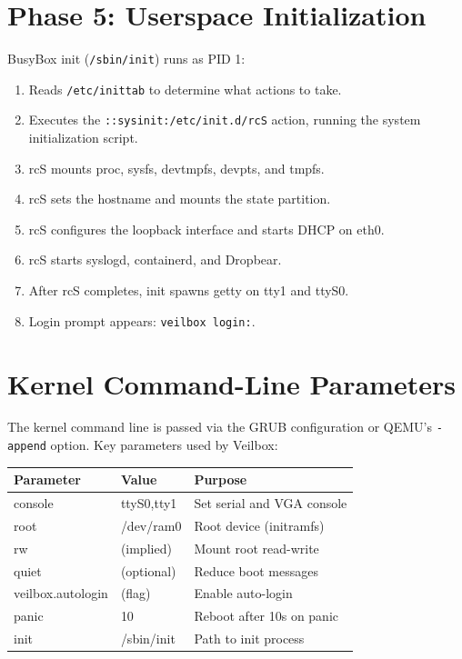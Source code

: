 \section{Phase 5: Userspace Initialization}

BusyBox init (\texttt{/sbin/init}) runs as PID 1:

\begin{enumerate}[nosep]
  \item Reads \texttt{/etc/inittab} to determine what actions to take.
  \item Executes the \texttt{::sysinit:/etc/init.d/rcS} action, running
        the system initialization script.
  \item rcS mounts proc, sysfs, devtmpfs, devpts, and tmpfs.
  \item rcS sets the hostname and mounts the state partition.
  \item rcS configures the loopback interface and starts DHCP on eth0.
  \item rcS starts syslogd, containerd, and Dropbear.
  \item After rcS completes, init spawns getty on tty1 and ttyS0.
  \item Login prompt appears: \texttt{veilbox login:}.
\end{enumerate}


\section{Kernel Command-Line Parameters}

The kernel command line is passed via the GRUB configuration or QEMU's
\texttt{-append} option. Key parameters used by Veilbox:

\begin{longtable}{|p{4cm}|p{3cm}|p{5cm}|}
\hline
\textbf{Parameter} & \textbf{Value} & \textbf{Purpose} \\
\hline
console & ttyS0,tty1 & Set serial and VGA console \\
root & /dev/ram0 & Root device (initramfs) \\
rw & (implied) & Mount root read-write \\
quiet & (optional) & Reduce boot messages \\
veilbox.autologin & (flag) & Enable auto-login \\
panic & 10 & Reboot after 10s on panic \\
init & /sbin/init & Path to init process \\
\hline
\end{longtable}

